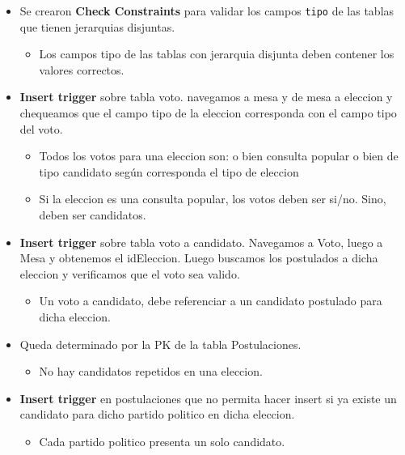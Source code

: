 \begin{itemize}
		\item Se crearon \textbf{Check Constraints} para validar los campos \texttt{tipo} de las tablas que tienen jerarquias disjuntas.
		\begin{itemize}
			\item Los campos tipo de las tablas con jerarquia disjunta deben contener los valores correctos. 
		\end{itemize}

	\item \textbf{Insert trigger} sobre tabla voto. navegamos a mesa y de mesa a eleccion y chequeamos que el campo tipo de la eleccion corresponda con el campo tipo del voto.
		\begin{itemize}
			\item Todos los votos para una eleccion son: o bien consulta popular o bien de tipo candidato según corresponda el tipo de eleccion
			\item Si la eleccion es una consulta popular, los votos deben ser si/no. Sino, deben ser candidatos.
		\end{itemize}

	\item \textbf{Insert trigger} sobre tabla voto a candidato. Navegamos a Voto, luego a Mesa y obtenemos el idEleccion. Luego buscamos los postulados a dicha eleccion y verificamos que el voto sea valido.
		\begin{itemize}
			\item Un voto a candidato, debe referenciar a un candidato postulado para dicha eleccion.
		\end{itemize}

	\item Queda determinado por la PK de la tabla Postulaciones.
		\begin{itemize}
			\item No hay candidatos repetidos en una eleccion.
		\end{itemize}

	\item \textbf{Insert trigger} en postulaciones que no permita hacer insert si ya existe un candidato para dicho partido politico en dicha eleccion.
		\begin{itemize}
			\item Cada partido politico presenta un solo candidato.
		\end{itemize}


\end{itemize}
